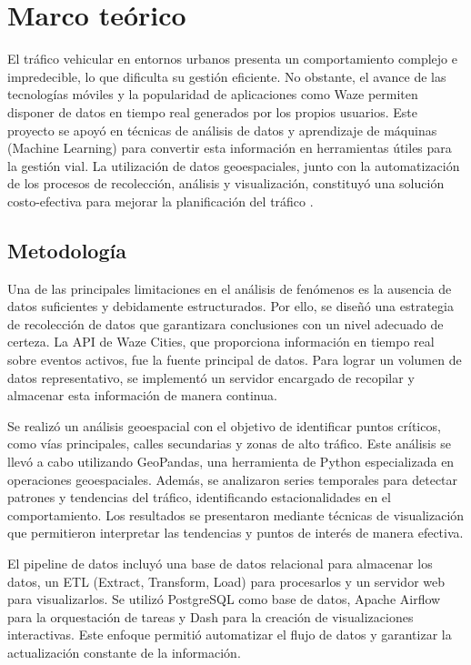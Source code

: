 \documentclass[12pt]{article}
\begin{document}
\section{Marco teórico}

El tráfico vehicular en entornos urbanos presenta un comportamiento complejo e impredecible, lo que dificulta su gestión eficiente. No obstante, el avance de las tecnologías móviles y la popularidad de aplicaciones como Waze permiten disponer de datos en tiempo real generados por los propios usuarios. Este proyecto se apoyó en técnicas de análisis de datos y aprendizaje de máquinas (Machine Learning) para convertir esta información en herramientas útiles para la gestión vial. La utilización de datos geoespaciales, junto con la automatización de los procesos de recolección, análisis y visualización, constituyó una solución costo-efectiva para mejorar la planificación del tráfico \parencite{barcelo2005}.

\subsection{Metodología}

Una de las principales limitaciones en el análisis de fenómenos es la ausencia de datos suficientes y debidamente estructurados. Por ello, se diseñó una estrategia de recolección de datos que garantizara conclusiones con un nivel adecuado de certeza. La API de Waze Cities, que proporciona información en tiempo real sobre eventos activos, fue la fuente principal de datos. Para lograr un volumen de datos representativo, se implementó un servidor encargado de recopilar y almacenar esta información de manera continua.

Se realizó un análisis geoespacial con el objetivo de identificar puntos críticos, como vías principales, calles secundarias y zonas de alto tráfico. Este análisis se llevó a cabo utilizando GeoPandas, una herramienta de Python especializada en operaciones geoespaciales. Además, se analizaron series temporales para detectar patrones y tendencias del tráfico, identificando estacionalidades en el comportamiento. Los resultados se presentaron mediante técnicas de visualización que permitieron interpretar las tendencias y puntos de interés de manera efectiva.

El pipeline de datos incluyó una base de datos relacional para almacenar los datos, un ETL (Extract, Transform, Load) para procesarlos y un servidor web para visualizarlos. Se utilizó PostgreSQL como base de datos, Apache Airflow para la orquestación de tareas y Dash para la creación de visualizaciones interactivas. Este enfoque permitió automatizar el flujo de datos y garantizar la actualización constante de la información.
\end{document}
